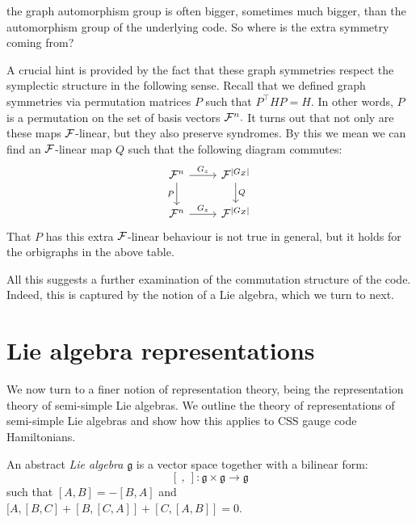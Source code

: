 \begin{framed}
the graph automorphism group is
often bigger, sometimes much bigger, than the automorphism group of
the underlying code.
So where is the extra symmetry coming from?
\end{framed}

A crucial hint is provided by the fact that these graph
symmetries respect the symplectic structure in the following sense.
Recall that we defined graph symmetries via permutation
matrices $P$ such that $P^{\top}HP=H.$
In other words, $P$ is a permutation on the set
of basis vectors $\mathcal{F}^n.$
It turns out that not only
are these maps $\mathcal{F}$-linear, but they also 
preserve syndromes. 
By this we mean we can find an $\mathcal{F}$-linear
map $Q$ such that the following diagram commutes:
\[
\begin{tikzcd}
\Field^n \arrow{r}{G_z} \arrow[swap]{d}{P} & \Field^{|G_Z|} \arrow{d}{Q} \\
\Field^n \arrow{r}{G_z} & \Field^{|G_Z|} 
\end{tikzcd}
\]
That $P$ has this extra $\mathcal{F}$-linear behaviour 
is not true in general, but it holds for the orbigraphs in the above
table.

All this suggests a further examination of the commutation structure
of the code.
Indeed, this is captured by the notion of a Lie algebra, which we turn to next.





%

\section{Lie algebra representations}


\def\lie{\mathfrak{g}}
\def\lieh{\mathfrak{h}}
\def\sl{\mathfrak{sl}}

We now turn to a finer notion of representation theory,
being the representation theory of semi-simple Lie algebras.
We outline the theory of representations
of semi-simple Lie algebras \cite{Fulton2013} and show
how this applies to CSS gauge code Hamiltonians.

An abstract 
\emph{Lie algebra} $\lie$ is 
a vector space together with a bilinear form:
$$
    [\ ,\  ] : \lie \times \lie \to \lie
$$
such that $[A,B] = -[B,A]$ and
$[A,[B,C]+[B,[C,A]]+[C,[A,B]]=0.$

